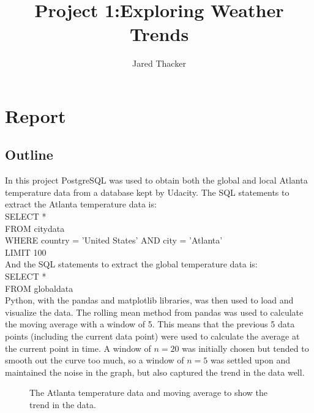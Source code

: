 \documentclass[12pt]{report}
\title{Project 1:Exploring Weather Trends}
\author{Jared Thacker}
\begin{document}
\maketitle

\chapter{Report}
\section{ Outline}
In this project PostgreSQL was used to obtain both the global and local Atlanta temperature data from a database kept by Udacity.  The SQL statements to extract the Atlanta temperature data is:\\

\noindent SELECT * \\
FROM city\textunderscore data \\
WHERE country = 'United States' AND city = 'Atlanta'\\
LIMIT 100 \\

\noindent And the SQL statements to extract the global temperature data is: \\

\noindent SELECT * \\
FROM global\textunderscore data \\

\noindent Python, with the pandas and matplotlib libraries, was then used to load and visualize the data. The rolling mean method from pandas was used to calculate the moving average with a window of 5. This means that the previous 5 data points (including the current data point) were used to calculate the average at the current point in time.  A window of $n = 20$ was initially chosen but tended to smooth out the curve too much, so a window of $n = 5$ was settled upon and maintained the noise in the graph, but also captured the trend in the data well.
\begin{figure}
        \caption{\label{fig:atlantaDataAndTrend} The Atlanta temperature data and moving average to show the trend in the data.}
\end{figure}
\end{document}
